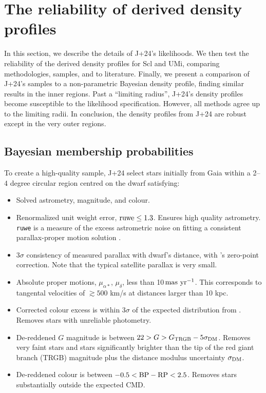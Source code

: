 \chapter{The reliability of derived density
profiles}\label{sec:extra_density}

In this section, we describe the details of J+24's likelihoods. We then
test the reliability of the derived density profiles for Scl and UMi,
comparing methodologies, samples, and to literature. Finally, we present
a comparison of J+24's samples to a non-parametric Bayesian density
profile, finding similar results in the inner regions. Past a ``limiting
radius'', J+24's density profiles become susceptible to the likelihood
specification. However, all methods agree up to the limiting radii. In
conclusion, the density profiles from J+24 are robust except in the very
outer regions.

\section{Bayesian membership
probabilities}\label{bayesian-membership-probabilities}

To create a high-quality sample, J+24 select stars initially from Gaia
within a 2--4 degree circular region centred on the dwarf satisfying:

\begin{itemize}
\tightlist
\item
  Solved astrometry, magnitude, and colour.
\item
  Renormalized unit weight error, \({\rm ruwe} \leq 1.3\). Ensures high
  quality astrometry. \texttt{ruwe} is a measure of the excess
  astrometric noise on fitting a consistent parallax-proper motion
  solution \citep[see][]{lindegren+2021}.
\item
  3\(\sigma\) consistency of measured parallax with dwarf's distance,
  with \citet{lindegren+2021}'s zero-point correction. Note that the
  typical satellite parallax is very small.
\item
  Absolute proper motions, \(\mu_{\alpha*}\), \(\mu_\delta\), less than
  10\(\,{\rm mas\ yr^{-1}}\). This corresponds to tangental velocities
  of \(\gtrsim 500\) km/s at distances larger than 10 kpc.
\item
  Corrected colour excess is within 3\(\sigma\) of the expected
  distribution from \citet{riello+2021}. Removes stars with unreliable
  photometry.
\item
  De-reddened \(G\) magnitude is between
  \(22 > G > G_{\rm TRGB} - 5\sigma_{\rm DM}\). Removes very faint stars
  and stars significantly brighter than the tip of the red giant branch
  (TRGB) magnitude plus the distance modulus uncertainty
  \(\sigma_{\rm DM}\).
\item
  De-reddened colour is between \(-0.5 < {\rm BP - RP} <  2.5\). Removes
  stars substantially outside the expected CMD.
\end{itemize}

